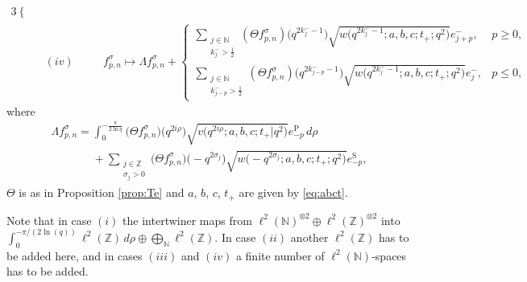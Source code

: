 \documentclass[pdftex]{sigma}
\numberwithin{equation}{section}
\numberwithin{theorem}{section}
\numberwithin{proposition}{section}
\numberwithin{lemma}{section}
\numberwithin{corollary}{section}
\numberwithin{definition}{section}
\numberwithin{example}{section}
\numberwithin{remark}{section}
\numberwithin{note}{section}
\newcommand{\N}{\mathbb N}
\newcommand{\Z}{\mathbb Z}
\begin{document}
\begin{theorem}
\begin{alignat*}{3}
\begin{cases}
\end{cases} &
\\
& (iv) \quad && f_{p,n}^\sigma \mapsto \Lambda f_{p,n}^\sigma +
\begin{cases}
\displaystyle \sum_{\substack{j \in \N\\k_j^->\frac12}} (\Theta f_{p,n}^\sigma)\big(q^{2k_j^--1}\big) \sqrt{w\big(q^{2k_j^--1};a,b,c;t_+;q^2\big)}e_{j+p}^-, & p \geq 0,\\
\displaystyle \sum_{\substack{j \in \N\\k_{j-p}^->\frac12}} (\Theta f_{p,n}^\sigma)\big(q^{2k_{j-p}^--1}\big) \sqrt{w\big(q^{2k_j^--1};a,b,c;t_+;q^2\big)} e_{j}^-, & p \leq 0,
\end{cases}&
\end{alignat*}
where
\begin{gather*}
\Lambda f_{p,n}^\sigma =  \int_0^{-\frac{\pi}{2\ln q}} \big(\Theta f_{p,n}^\sigma\big)\big(q^{2i\rho}\big) \sqrt{v\big(q^{2i\rho};a,b,c;t_+|q^2\big)}  e_{-p}^{\mathrm P}\, d\rho\\
\phantom{\Lambda f_{p,n}^\sigma =}{} + \sum_{\substack{j \in \Z\\\sigma_j>0}} \big(\Theta f_{p,n}^\sigma\big)\big({-}q^{2\sigma_j}\big) \sqrt{w\big({-}q^{2\sigma_j};a,b,c;t_+;q^2\big)} e_{-p}^{\mathrm S},
\end{gather*}
$\Theta$ is as in Proposition {\rm \ref{prop:Te}} and $a$, $b$, $c$, $t_+$ are given by \eqref{eq:abct}.
\end{theorem}

Note that in case $(i)$ the intertwiner maps from $\ell^2(\N)^{\otimes 2} \oplus \ell^2(\Z)^{\otimes 2}$ into $\int_0^{-\pi/(2\ln(q))} \ell^2(\Z)\, d\rho \oplus \bigoplus_{\N} \ell^2(\Z)$. In case $(ii)$ another $\ell^2(\Z)$ has to be added here, and in cases $(iii)$ and $(iv)$ a f\/inite number of $\ell^2(\N)$-spaces has to be added.
\end{document}
